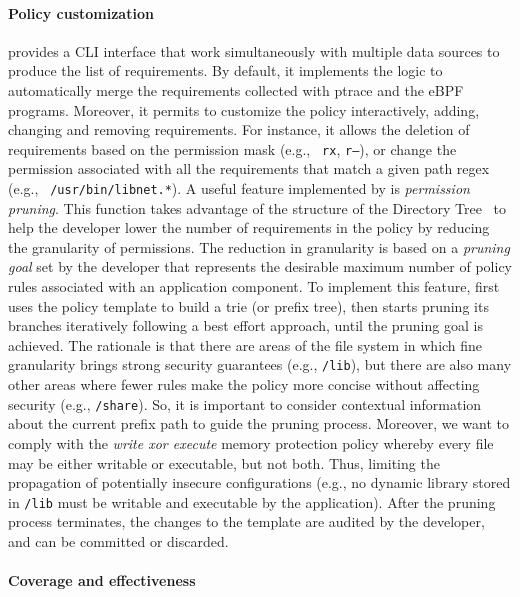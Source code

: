\paragraph*{Policy customization} \dmng provides a CLI interface that
work simultaneously with multiple data sources to produce the list of
requirements. By default, it implements the logic to automatically
merge the requirements collected with ptrace and the eBPF
programs. Moreover, it permits to customize the policy interactively,
adding, changing and removing requirements. For instance, it allows the
deletion of requirements based on the permission mask (e.g., {\tt
  r\textunderscore x}, {\tt r--}), or change the permission associated
with all the requirements that match a given path regex (e.g., {\tt
  /usr/bin/libnet.*}).  \newline A useful feature implemented by \dmng
is {\em permission pruning}. This function takes advantage of the
structure of the Directory Tree~\cite{hier} to help the developer
lower the number of requirements in the policy by reducing the
granularity of permissions. The reduction in granularity is based on a
{\em pruning goal} set by the developer that represents the desirable
maximum number of policy rules associated with an application
component. To implement this feature, \dmng first uses the policy
template to build a trie (or prefix tree), then starts pruning its
branches iteratively following a best effort approach, until the
pruning goal is achieved.  The rationale is that there are areas of
the file system in which fine granularity brings strong security
guarantees (e.g., {\tt /lib}), but there are also many other areas
where fewer rules make the policy more concise without affecting
security (e.g., {\tt /share}). So, it is important to consider
contextual information about the current prefix path to guide the
pruning process.  Moreover, we want to comply with the {\em write xor
  execute} memory protection policy whereby every file may be either
writable or executable, but not both. Thus, limiting the propagation
of potentially insecure configurations (e.g., no dynamic library
stored in {\tt /lib} must be writable and executable by the
application).  After the pruning process terminates, the changes to the
template are audited by the developer, and can be committed or
discarded.

\paragraph*{Coverage and effectiveness}

